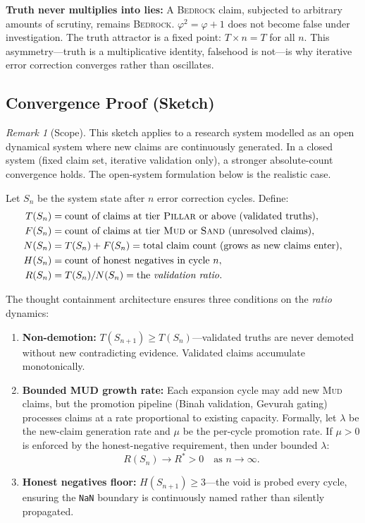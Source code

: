 \documentclass[11pt]{article}
\theoremstyle{definition}
\theoremstyle{remark}
\newtheorem{remark}[theorem]{Remark}
\newcommand{\NaN}{\texttt{NaN}}
\newcommand{\BEDROCK}{\textsc{Bedrock}}
\newcommand{\PILLAR}{\textsc{Pillar}}
\newcommand{\SAND}{\textsc{Sand}}
\newcommand{\MUD}{\textsc{Mud}}
\begin{document}
\medskip
\noindent\textbf{Truth never multiplies into lies:}  A \BEDROCK{} claim,
subjected to arbitrary amounts of scrutiny, remains \BEDROCK.  $\varphi^2 =
\varphi + 1$ does not become false under investigation.  The truth attractor is a
fixed point: $T \times n = T$ for all $n$.  This asymmetry---truth is a
multiplicative identity, falsehood is not---is why iterative error correction
converges rather than oscillates.

\subsection{Convergence Proof (Sketch)}
\label{sec:convergence}

\begin{remark}[Scope]
This sketch applies to a research system modelled as an open dynamical system
where new claims are continuously generated.  In a closed system (fixed claim
set, iterative validation only), a stronger absolute-count convergence holds.
The open-system formulation below is the realistic case.
\end{remark}

Let $S_n$ be the system state after $n$ error correction cycles.  Define:
\begin{align*}
  T(S_n) &= \text{count of claims at tier \PILLAR{} or above (validated truths)}, \\
  F(S_n) &= \text{count of claims at tier \MUD{} or \SAND{} (unresolved claims)}, \\
  N(S_n) &= T(S_n) + F(S_n) = \text{total claim count (grows as new claims enter)}, \\
  H(S_n) &= \text{count of honest negatives in cycle } n, \\
  R(S_n) &= T(S_n) / N(S_n) = \text{the \emph{validation ratio}}.
\end{align*}

The thought containment architecture ensures three conditions on the \emph{ratio}
dynamics:

\begin{enumerate}
  \item \textbf{Non-demotion:} $T(S_{n+1}) \geq T(S_n)$---validated truths are
    never demoted without new contradicting evidence.  Validated claims accumulate
    monotonically.

  \item \textbf{Bounded MUD growth rate:}  Each expansion cycle may add new
    \MUD{} claims, but the promotion pipeline (Binah validation, Gevurah gating)
    processes claims at a rate proportional to existing capacity.  Formally, let
    $\lambda$ be the new-claim generation rate and $\mu$ be the per-cycle
    promotion rate.  If $\mu > 0$ is enforced by the honest-negative requirement,
    then under bounded $\lambda$:
    \[
      R(S_n) \to R^* > 0 \quad \text{as } n \to \infty.
    \]

  \item \textbf{Honest negatives floor:} $H(S_{n+1}) \geq 3$---the void is
    probed every cycle, ensuring the \NaN{} boundary is continuously named rather
    than silently propagated.
\end{enumerate}
\end{document}
